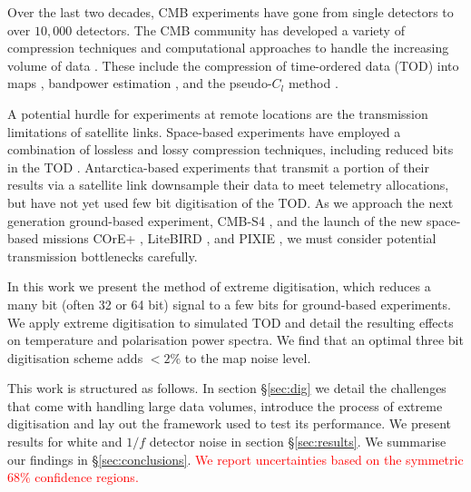 \documentclass[apj]{emulateapj}
\newcommand{\changed}[1]{\textcolor{Red}{#1}}
\begin{document}

Over the last two decades, CMB experiments have gone from single detectors to over $10,000$ detectors. The CMB community has developed a variety of compression techniques and computational approaches to handle the increasing volume of data \citep{tristam2007}. These include the compression of time-ordered data (TOD) into maps \citep{tegmark1997}, bandpower estimation \citep{tegmark1998}, and the pseudo-$C_l$ method \citep{brown2005}.

A potential hurdle for experiments at remote locations are the transmission limitations of satellite links. 
Space-based experiments have employed a combination of lossless and lossy compression techniques, including reduced bits in the TOD \citep{gaztanaga1998, maris2003}. 
Antarctica-based experiments that transmit a portion of their results via a satellite link downsample their data to meet telemetry allocations, but have not yet used few bit digitisation of the TOD. 
As we approach the next generation ground-based experiment, CMB-S4 \citep{s4sciencebook}, and the launch of the new space-based missions COrE+ \citep{core2018}, LiteBIRD \citep{litebird2016}, and PIXIE \citep{pixie2011}, we must consider potential transmission bottlenecks carefully. %

In this work we present the method of extreme digitisation, which reduces a many bit (often 32 or 64 bit) signal to a few bits for ground-based experiments. 
We apply extreme digitisation to simulated TOD and detail the resulting effects on temperature and polarisation power spectra. 
We find that an optimal three bit digitisation scheme adds $<2\%$ to the map noise level.

This work is structured as follows. In section \S\ref{sec:dig} we detail the challenges that come with handling large data volumes, introduce the process of extreme digitisation and lay out the framework used to test its performance. 
We present results for white and $1/f$ detector noise in section \S\ref{sec:results}. 
We summarise our findings in \S\ref{sec:conclusions}.
\changed{We report uncertainties based on the symmetric 68\% confidence regions. }

\end{document}
